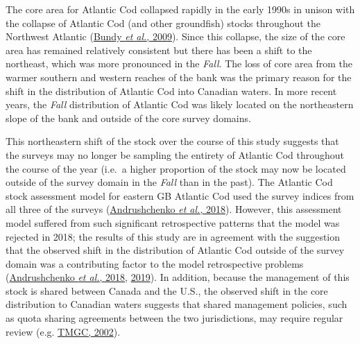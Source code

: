 \documentclass[
]{article}
\begin{document}
The core area for Atlantic Cod collapsed rapidly in the early 1990s in unison with the collapse of Atlantic Cod (and other groundfish) stocks throughout the Northwest Atlantic (\protect\hyperlink{ref-bundySealsCodForage2009}{Bundy \emph{et al.}, 2009}). Since this collapse, the size of the core area has remained relatively consistent but there has been a shift to the northeast, which was more pronounced in the \emph{Fall}. The loss of core area from the warmer southern and western reaches of the bank was the primary reason for the shift in the distribution of Atlantic Cod into Canadian waters. In more recent years, the \emph{Fall} distribution of Atlantic Cod was likely located on the northeastern slope of the bank and outside of the core survey domains.

This northeastern shift of the stock over the course of this study suggests that the surveys may no longer be sampling the entirety of Atlantic Cod throughout the course of the year (i.e.~a higher proportion of the stock may now be located outside of the survey domain in the \emph{Fall} than in the past). The Atlantic Cod stock assessment model for eastern GB Atlantic Cod used the survey indices from all three of the surveys (\protect\hyperlink{ref-andrushchenkoAssessmentEasternGeorges2018}{Andrushchenko \emph{et al.}, 2018}). However, this assessment model suffered from such significant retrospective patterns that the model was rejected in 2018; the results of this study are in agreement with the suggestion that the observed shift in the distribution of Atlantic Cod outside of the survey domain was a contributing factor to the model retrospective problems (\protect\hyperlink{ref-andrushchenkoAssessmentEasternGeorges2018}{Andrushchenko \emph{et al.}, 2018}, \protect\hyperlink{ref-andrushchenkoAlternativeMethodologiesProviding2019}{2019}). In addition, because the management of this stock is shared between Canada and the U.S., the observed shift in the core distribution to Canadian waters suggests that shared management policies, such as quota sharing agreements between the two jurisdictions, may require regular review (e.g. \protect\hyperlink{ref-tmgcDevelopmentSharingAllocation2002}{TMGC, 2002}).
\end{document}
